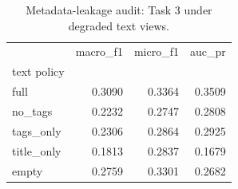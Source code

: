 \begin{table}[t]
\caption{Metadata-leakage audit: Task 3 under degraded text views.}
\label{tab:leak}
\begin{tabular}{lrrr}
\toprule
 & macro\_f1 & micro\_f1 & auc\_pr \\
text policy &  &  &  \\
\midrule
full & 0.3090 & 0.3364 & 0.3509 \\
no\_tags & 0.2232 & 0.2747 & 0.2808 \\
tags\_only & 0.2306 & 0.2864 & 0.2925 \\
title\_only & 0.1813 & 0.2837 & 0.1679 \\
empty & 0.2759 & 0.3301 & 0.2682 \\
\bottomrule
\end{tabular}
\end{table}
